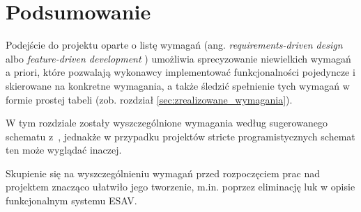 
\section{Podsumowanie}
\label{sec:wstep_podsumowanie}

Podejście do projektu oparte o listę wymagań (ang. \textit{requirements-driven design} \cite{Hug10} albo \textit{feature-driven development} \cite{Goy08}) umożliwia sprecyzowanie niewielkich wymagań a priori, które pozwalają wykonawcy implementować funkcjonalności pojedyncze i skierowane na konkretne wymagania, a także śledzić spełnienie tych wymagań w formie prostej tabeli (zob. rozdział \ref{sec:zrealizowane_wymagania}).

W tym rozdziale zostały wyszczególnione wymagania według sugerowanego schematu z~\cite{Hug10}, jednakże w przypadku projektów stricte programistycznych schemat ten może wyglądać inaczej.

Skupienie się na wyszczególnieniu wymagań przed rozpoczęciem prac nad projektem znacząco ułatwiło jego tworzenie, m.in. poprzez eliminację luk w opisie funkcjonalnym systemu ESAV.


